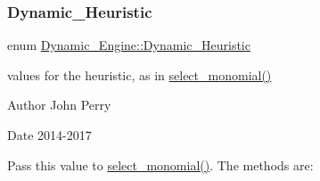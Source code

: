 \subsubsection{\texorpdfstring{Dynamic\+\_\+\+Heuristic}{Dynamic\_Heuristic}}
{\footnotesize\ttfamily enum \hyperlink{group___g_b_computation_ga819b1fd40d9a40ff303df3b90647ecb0}{Dynamic\+\_\+\+Engine\+::\+Dynamic\+\_\+\+Heuristic}\hspace{0.3cm}{\ttfamily [strong]}}



values for the heuristic, as in {\ttfamily \hyperlink{group___g_b_computation_gaa01d88c431b84deabf51ee116d7d2a0e}{select\+\_\+monomial()}} 

\begin{DoxyAuthor}{Author}
John Perry 
\end{DoxyAuthor}
\begin{DoxyDate}{Date}
2014-\/2017
\end{DoxyDate}
Pass this value to {\ttfamily \hyperlink{group___g_b_computation_gaa01d88c431b84deabf51ee116d7d2a0e}{select\+\_\+monomial()}}. The methods are\+:
